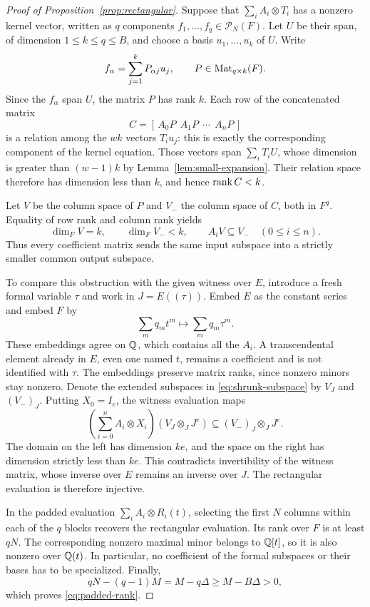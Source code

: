 \begin{proof}[Proof of Proposition~\ref{prop:rectangular}]
Suppose that $\sum_iA_i\otimes T_i$ has a nonzero kernel vector,
written as $q$ components $f_1,\ldots,f_q\in\mathcal P_N(F)$.  Let
$U$ be their span, of dimension $1\leq k\leq q\leq B$, and choose
a basis $u_1,\ldots,u_k$ of $U$.  Write
\[
  f_\alpha=\sum_{j=1}^k P_{\alpha j}u_j,
  \qquad P\in\operatorname{Mat}_{q\times k}(F).
\]
Since the $f_\alpha$ span $U$, the matrix $P$ has rank $k$.  Each
row of the concatenated matrix
\[
  C=[\,A_0P\ \ A_1P\ \ \cdots\ \ A_nP\,]
\]
is a relation among the $wk$ vectors $T_i u_j$: this is exactly the
corresponding component of the kernel equation.  Those vectors span
$\sum_iT_iU$, whose dimension is greater than $(w-1)k$ by
Lemma~\ref{lem:small-expansion}.  Their relation space therefore has
dimension less than $k$, and hence $\operatorname{rank} C<k$.

Let $V$ be the column space of $P$ and $V_-$ the column space of $C$,
both in $F^q$.  Equality of row rank and column rank yields
\begin{equation}
  \dim_F V=k,\qquad \dim_FV_-<k,
  \qquad A_iV\subseteq V_-\quad(0\leq i\leq n).
  \label{eq:shrunk-subspace}
\end{equation}
Thus every coefficient matrix sends the same input subspace into a
strictly smaller common output subspace.

To compare this obstruction with the given witness over $E$, introduce
a fresh formal variable $\tau$ and work in $J=E((\tau))$.  Embed $E$
as the constant series and embed $F$ by
\[
  \sum_m q_m t^m\longmapsto\sum_m q_m\tau^m.
\]
These embeddings agree on $\mathbb Q$, which contains all the $A_i$.  A
transcendental element already in $E$, even one named $t$, remains a
coefficient and is not identified with $\tau$.  The embeddings preserve
matrix ranks, since nonzero minors stay nonzero.  Denote the extended
subspaces in \eqref{eq:shrunk-subspace} by $V_J$ and $(V_-)_J$.
Putting $X_0=I_e$, the witness evaluation maps
\[
  \left(\sum_{i=0}^n A_i\otimes X_i\right)
       (V_J\otimes_J J^e)
  \subseteq (V_-)_J\otimes_J J^e.
\]
The domain on the left has dimension $ke$, and the space on the right
has dimension strictly less than $ke$.  This contradicts invertibility
of the witness matrix, whose inverse over $E$ remains an inverse over
$J$.  The rectangular evaluation is therefore injective.

In the padded evaluation $\sum_iA_i\otimes R_i(t)$, selecting the
first $N$ columns within each of the $q$ blocks recovers the rectangular
evaluation.  Its rank over $F$ is at least $qN$.  The corresponding
nonzero maximal minor belongs to $\mathbb Q[t]$, so it is also nonzero over
$\mathbb Q(t)$.  In particular, no coefficient of the formal subspaces or
their bases has to be specialized.  Finally,
\[
  qN-(q-1)M=M-q\Delta\geq M-B\Delta>0,
\]
which proves \eqref{eq:padded-rank}.
\end{proof}
